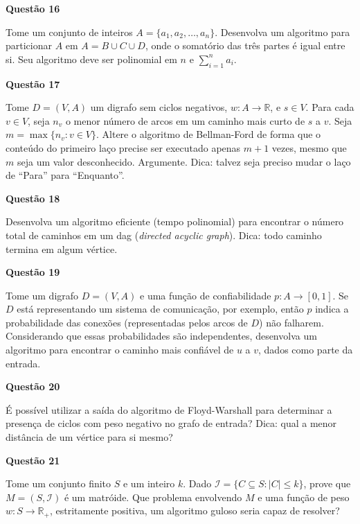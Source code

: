 \documentclass[]{article}
\begin{document}
\textbf{Questão 16}

Tome um conjunto de inteiros $A = \{a_1, a_2, \dots, a_n\}$.
Desenvolva um algoritmo para particionar $A$ em $A = B \cup C \cup D$,
onde o somatório das três partes é igual entre si.  Seu algoritmo deve
ser polinomial em $n$ e $\sum_{i = 1}^n a_i$.

\vspace{\baselineskip}

\textbf{Questão 17}

Tome $D = (V, A)$ um digrafo sem ciclos negativos,
$w : A \to \mathbb{R}$, e $s \in V$.  Para cada $v \in V$, seja $n_v$
o menor número de arcos em um caminho mais curto de $s$ a $v$.  Seja
$m = \max\{n_v : v \in V\}$.  Altere o algoritmo de Bellman-Ford de
forma que o conteúdo do primeiro laço precise ser executado apenas
$m + 1$ vezes, mesmo que $m$ seja um valor desconhecido.  Argumente.
Dica: talvez seja preciso mudar o laço de ``Para'' para ``Enquanto''.

\vspace{\baselineskip}

\textbf{Questão 18}

Desenvolva um algoritmo eficiente (tempo polinomial) para encontrar o
número total de caminhos em um dag (\emph{directed acyclic graph}).
Dica: todo caminho termina em algum vértice.

\vspace{\baselineskip}

\textbf{Questão 19}

Tome um digrafo $D = (V, A)$ e uma função de confiabilidade
$p : A \to [0, 1]$.  Se $D$ está representando um sistema de
comunicação, por exemplo, então $p$ indica a probabilidade das
conexões (representadas pelos arcos de $D$) não falharem.
Considerando que essas probabilidades são independentes, desenvolva um
algoritmo para encontrar o caminho mais confiável de $u$ a $v$, dados
como parte da entrada.

\vspace{\baselineskip}

\textbf{Questão 20}

É possível utilizar a saída do algoritmo de Floyd-Warshall para
determinar a presença de ciclos com peso negativo no grafo de entrada?
Dica: qual a menor distância de um vértice para si mesmo?

\vspace{\baselineskip}

\textbf{Questão 21}

Tome um conjunto finito $S$ e um inteiro $k$.  Dado
$\mathcal{I} = \{C \subseteq S : |C| \leq k\}$, prove que
$M = (S, \mathcal{I})$ é um matróide.  Que problema envolvendo $M$ e
uma função de peso $w : S \to \mathbb{R}_+$, estritamente positiva, um
algoritmo guloso seria capaz de resolver?
\end{document}
